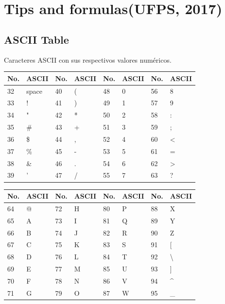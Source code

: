 \documentclass[10pt,landscape,twocolumn,a4paper,notitlepage]{article}
\begin{document}
	
	\section{Tips and formulas(UFPS, 2017)}

		\subsection{ASCII Table}
			Caracteres ASCII con sus respectivos valores numéricos.

		\begin{table}[H]
			\begin{tabular}{|l|l|l|l|l|l|l|l|}
				\hline \textbf{No.} & \textbf{ASCII} & \textbf{No.} & \textbf{ASCII}  &
					\textbf{No.} & \textbf{ASCII} & \textbf{No.} & \textbf{ASCII} \\ \hline
				32 & space & 40 & ( & 48 & 0 & 56 & 8 \\ \hline
				33 &  ! & 41 & ) & 49 & 1 & 57 & 9 \\ \hline
				34 &  " & 42 & * & 50 & 2 & 58 & : \\ \hline
				35 & \# & 43 & + & 51 & 3 & 59 & ; \\ \hline
				36 & \$ & 44 & , & 52 & 4 & 60 & < \\ \hline
				37 & \% & 45 & - & 53 & 5 & 61 & = \\ \hline
				38 & \& & 46 & . & 54 & 6 & 62 & > \\ \hline
				39 &  ' & 47 & / & 55 & 7 & 63 & ? \\ \hline
			\end{tabular}
		\end{table}
		
		
		\begin{table}[H]
			\begin{tabular}{|l|l|l|l|l|l|l|l|}
				\hline \textbf{No.} & \textbf{ASCII} & \textbf{No.} & \textbf{ASCII}  &
					\textbf{No.} & \textbf{ASCII} & \textbf{No.} & \textbf{ASCII} \\ \hline
				64 & @ & 72 & H & 80 & P & 88 & X \\ \hline
				65 & A & 73 & I & 81 & Q & 89 & Y \\ \hline
				66 & B & 74 & J & 82 & R & 90 & Z \\ \hline
				67 & C & 75 & K & 83 & S & 91 & [ \\ \hline
				68 & D & 76 & L & 84 & T & 92 & \textbackslash \\ \hline
				69 & E & 77 & M & 85 & U & 93 & ] \\ \hline
				70 & F & 78 & N & 86 & V & 94 & \textasciicircum \\ \hline
				71 & G & 79 & O & 87 & W & 95 & \_ \\ \hline
			\end{tabular}
		\end{table}
		
\end{document}
